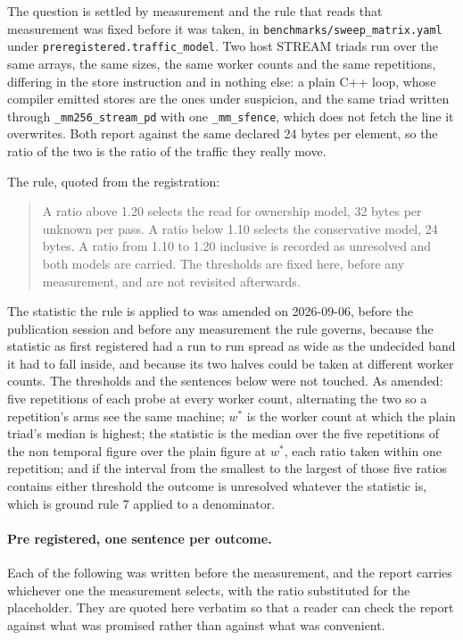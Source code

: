The question is settled by measurement and the rule that reads that measurement
was fixed before it was taken, in
\texttt{benchmarks/sweep\_matrix.yaml} under
\texttt{preregistered.traffic\_model}. Two host STREAM triads run over the same
arrays, the same sizes, the same worker counts and the same repetitions,
differing in the store instruction and in nothing else: a plain C++ loop, whose
compiler emitted stores are the ones under suspicion, and the same triad written
through \texttt{\_mm256\_stream\_pd} with one \texttt{\_mm\_sfence}, which does
not fetch the line it overwrites. Both report against the same declared 24 bytes
per element, so the ratio of the two is the ratio of the traffic they really
move.

The rule, quoted from the registration:

\begin{quote}
A ratio above 1.20 selects the read for ownership model, 32 bytes per unknown
per pass. A ratio below 1.10 selects the conservative model, 24 bytes. A ratio
from 1.10 to 1.20 inclusive is recorded as unresolved and both models are
carried. The thresholds are fixed here, before any measurement, and are not
revisited afterwards.
\end{quote}

The statistic the rule is applied to was amended on 2026-09-06, before the
publication session and before any measurement the rule governs, because the
statistic as first registered had a run to run spread as wide as the undecided
band it had to fall inside, and because its two halves could be taken at
different worker counts. The thresholds and the sentences below were not
touched. As amended: five repetitions of each probe at every worker count,
alternating the two so a repetition's arms see the same machine; $w^*$ is the
worker count at which the plain triad's median is highest; the statistic is the
median over the five repetitions of the non temporal figure over the plain
figure at $w^*$, each ratio taken within one repetition; and if the interval
from the smallest to the largest of those five ratios contains either threshold
the outcome is unresolved whatever the statistic is, which is ground rule 7
applied to a denominator.

\paragraph{Pre registered, one sentence per outcome.} Each of the following was
written before the measurement, and the report carries whichever one the
measurement selects, with the ratio substituted for the placeholder. They are
quoted here verbatim so that a reader can check the report against what was
promised rather than against what was convenient.

